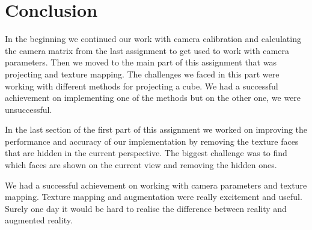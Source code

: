 \section{Conclusion}
In the beginning we continued our work with camera calibration and calculating the camera matrix from the last assignment to get used to work with camera parameters. Then we moved to the main part of this assignment that was projecting and texture mapping. The challenges we faced in this part were working with different methods for projecting a cube. We had a successful achievement on implementing one of the methods but on the other one, we were unsuccessful.

In the last section of the first part of this assignment we worked on improving the performance and accuracy of our implementation by removing the texture faces that are hidden in the current perspective.  The biggest challenge was to find which faces are shown on the current view and removing the hidden ones.

We had a successful achievement on working with camera parameters and texture mapping. Texture mapping and augmentation were really excitement and useful. Surely one day it would be hard to realise the difference between reality and augmented reality. 
